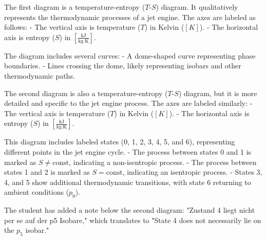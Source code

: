 The first diagram is a temperature-entropy (\( T \)-\( S \)) diagram. It qualitatively represents the thermodynamic processes of a jet engine. The axes are labeled as follows:  
- The vertical axis is temperature (\( T \)) in Kelvin (\( [K] \)).  
- The horizontal axis is entropy (\( S \)) in \( \left[\frac{\text{kJ}}{\text{kg·K}}\right] \).  

The diagram includes several curves:  
- A dome-shaped curve representing phase boundaries.  
- Lines crossing the dome, likely representing isobars and other thermodynamic paths.  

The second diagram is also a temperature-entropy (\( T \)-\( S \)) diagram, but it is more detailed and specific to the jet engine process. The axes are labeled similarly:  
- The vertical axis is temperature (\( T \)) in Kelvin (\( [K] \)).  
- The horizontal axis is entropy (\( S \)) in \( \left[\frac{\text{kJ}}{\text{kg·K}}\right] \).  

This diagram includes labeled states (0, 1, 2, 3, 4, 5, and 6), representing different points in the jet engine cycle.  
- The process between states 0 and 1 is marked as \( S \neq \text{const} \), indicating a non-isentropic process.  
- The process between states 1 and 2 is marked as \( S = \text{const} \), indicating an isentropic process.  
- States 3, 4, and 5 show additional thermodynamic transitions, with state 6 returning to ambient conditions (\( p_0 \)).  

The student has added a note below the second diagram:  
"Zustand 4 liegt nicht per se auf der p5 Isobare," which translates to "State 4 does not necessarily lie on the \( p_5 \) isobar."